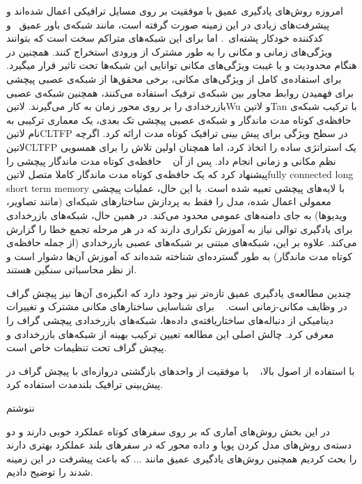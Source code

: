 امروزه روش‌های یادگیری عمیق با موفقیت بر روی مسايل ترافیکی اعمال شده‌اند و پیشرفت‌های زیادی در این زمینه صورت گرفته است، مانند شبکه‌ی باور عمیق~ و کدکننده خودکار پشته‌ای~.
اما برای این شبکه‌های متراکم سخت است که بتوانند ویژگی‌های زمانی و مکانی را به طور مشترک از ورودی استخراج کنند.
همچنین در هنگام محدودیت و یا غیبت ویژگی‌های مکانی توانایی این شبکه‌ها تحت تاثیر قرار میگیرد.
برای استفاده‌ی کامل از ویژگی‌های مکانی، برخی محقق‌ها از شبکه‌ی عصبی پیچشی  برای فهمیدن روابط مجاور بین شبکه‌ی ترفیک استفاده می‌کنند، همچنین شبکه‌ی عصبی بازرخدادی  را بر روی محور زمان به کار می‌گیرند. ‌لاتین{Wu} و ‌لاتین{Tan} با ترکیب شبکه‌ی حافظه‌ی کوتاه مدت ماندگار و شبکه‌ی عصبی پیچشی تک بعدی، یک معماری ترکیبی به نام ‌لاتین{CLTFP} در سطح ویژگی برای پیش بینی ترافیک کوتاه مدت ارائه کرد. اگرچه ‌لاتین{CLTFP} یک استراتژی ساده را اتخاذ کرد، اما همچنان اولین تلاش را برای همسویی نظم مکانی و زمانی انجام داد. پس از آن ~ حافظه‌ی کوتاه مدت ماندگار پیچشی را پیشنهاد کرد که یک حافظه‌ی کوتاه مدت ماندگار کاملا متصل ‌لاتین{fully connected long short term memory} با لایه‌های پیچشی تعبیه شده است. با این حال، عملیات پیچشی معمولی اعمال شده، مدل را فقط به پردازش ساختارهای شبکه‌ای (مانند تصاویر، ویدیوها) به جای دامنه‌های عمومی محدود می‌کند. در همین حال، شبکه‌های بازرخدادی برای یادگیری توالی نیاز به آموزش تکراری دارند که در هر مرحله تجمع خطا را گزارش می‌کند. علاوه بر این، شبکه‌های مبتنی بر شبکه‌های عصبی بازرخدادی (از جمله حافظه‌ی کوتاه مدت ماندگار) به طور گسترده‌ای شناخته شده‌اند که آموزش آن‌ها دشوار است و از نظر محاسباتی سنگین هستند.

چندین مطالعه‌ی یادگیری عمیق تازه‌تر نیز وجود دارد که انگیزه‌ی آن‌ها نیز پیچش گراف در وظایف مکانی-زمانی است. ~ برای شناسایی ساختارهای مکانی مشترک و تغییرات دینامیکی از دنباله‌های ساختاریافته‌ی داده‌ها، شبکه‌های بازرخدادی پیچشی گراف  را معرفی کرد. چالش اصلی این مطالعه تعیین ترکیب بهینه از شبکه‌های بازرخدادی و پیچش گراف تحت تنظیمات خاص است.

با استفاده از اصول بالا، ~ با موفقیت از واحدهای بازگشتی دروازه‌ای  با پیچش گراف در پیش‌بینی ترافیک بلندمدت استفاده کرد.

ننوشتم


































در این بخش روش‌های آماری که بر روی سفرهای کوتاه عملکرد خوبی دارند و دو دسته‌ی روش‌های مدل کردن پویا و داده محور که در سفرهای بلند عملکرد بهتری دارند را بحث کردیم همچنین روش‌های یادگیری عمیق مانند ... که باعث پیشرفت در این زمینه شدند را توضیح دادیم.
